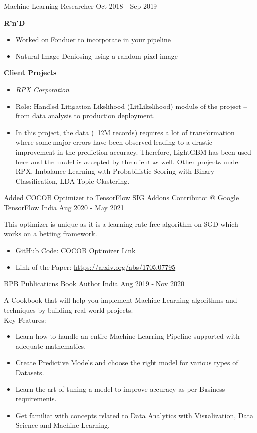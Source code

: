 \begin{cventries}
	\cventry
	{Machine Learning Researcher}
	{}
	{}
	{Oct 2018 - Sep 2019}
	{
		\begin{justify}
			\textbf{R'n'D}
			\begin{itemize}
				\item Worked on Fonduer to incorporate in your pipeline
				\item Natural Image Deniosing using a random pixel image
			\end{itemize}
			\textbf{Client Projects}
			\begin{itemize}
				\item[] \textit{RPX Corporation}
				\item Role: Handled Litigation Likelihood (LitLikelihood) module of the project – from data analysis to production deployment.
				\item In this project, the data (~12M records) requires a lot of transformation where some major errors have been observed leading to a drastic improvement in the prediction accuracy. Therefore, LightGBM has been used here and the model is accepted by the client as well. Other projects under RPX, Imbalance Learning with Probabilistic Scoring with Binary Classification, LDA Topic Clustering.
			\end{itemize}
		\end{justify}
	}
	
	\cventry
	{Added COCOB Optimizer to TensorFlow SIG Addons}
	{Contributor @ Google TensorFlow}
	{India}
	{Aug 2020 - May 2021}
	{
		\begin{justify}
			This optimizer is unique as it is a learning rate free algorithm on SGD which works on a betting framework.
			\begin{itemize}
				\item GitHub Code: \href{https://github.com/tensorflow/addons/blob/master/tensorflow_addons/optimizers/cocob.py}{COCOB Optimizer Link}
				\item Link of the Paper: \href{https://arxiv.org/abs/1705.07795}{https://arxiv.org/abs/1705.07795}
			\end{itemize}
		\end{justify}
	}


	\cventry
	{BPB Publications}
	{Book Author}
	{India}
	{Aug 2019 - Nov 2020}
	{\begin{justify}
			A Cookbook that will help you implement Machine Learning algorithms and techniques by building real-world projects.\\
			Key Features:
			\begin{itemize}
				\item Learn how to handle an entire Machine Learning Pipeline supported with adequate mathematics.
				\item Create Predictive Models and choose the right model for various types of Datasets.
				\item Learn the art of tuning a model to improve accuracy as per Business requirements.
				\item Get familiar with concepts related to Data Analytics with Visualization, Data Science and Machine
				      Learning.
			\end{itemize}
		\end{justify}
	}


\end{cventries}
